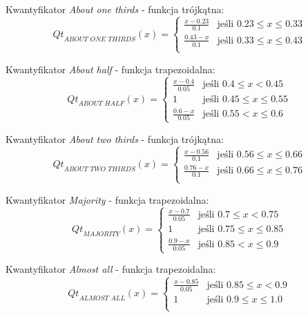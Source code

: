 \documentclass{classrep}
\begin{document}
Kwantyfikator \textit{About one thirds} - funkcja trójkątna:
\begin{equation}
{Qt}_{\textit{ABOUT ONE THIRDS}}(x)= \left\{ \begin{array}{ll}
\frac{x-0.23}{0.1} 	 & \textrm{jeśli $0.23 \leq x \leq 0.33$} \\
\frac{0.43-x}{0.1} 	 & \textrm{jeśli $0.33 \leq x \leq 0.43$} \\
\end{array} \right.
\end{equation}

Kwantyfikator \textit{About half} - funkcja trapezoidalna:
\begin{equation}
{Qt}_{\textit{ABOUT HALF}}(x)= \left\{ \begin{array}{ll}
\frac{x-0.4}{0.05} 	& \textrm{jeśli $0.4 \leq x < 0.45$} \\
1 			& \textrm{jeśli $0.45 \leq x \leq 0.55$} \\
\frac{0.6-x}{0.05} 	& \textrm{jeśli $0.55 < x \leq 0.6$}
\end{array} \right.
\end{equation}

Kwantyfikator \textit{About two thirds} - funkcja trójkątna:
\begin{equation}
{Qt}_{\textit{ABOUT TWO THIRDS}}(x)= \left\{ \begin{array}{ll}
\frac{x-0.56}{0.1} 	 & \textrm{jeśli $0.56 \leq x \leq 0.66$} \\
\frac{0.76-x}{0.1} 	 & \textrm{jeśli $0.66 \leq x \leq 0.76$} \\
\end{array} \right.
\end{equation}

Kwantyfikator \textit{Majority} - funkcja trapezoidalna:
\begin{equation}
{Qt}_{\textit{MAJORITY}}(x)= \left\{ \begin{array}{ll}
\frac{x-0.7}{0.05} 	& \textrm{jeśli $0.7 \leq x < 0.75$} \\
1 			& \textrm{jeśli $0.75 \leq x \leq 0.85$} \\
\frac{0.9-x}{0.05} 	& \textrm{jeśli $0.85 < x \leq 0.9$}
\end{array} \right.
\end{equation}

Kwantyfikator \textit{Almost all} - funkcja trapezoidalna:
\begin{equation}
{Qt}_{\textit{ALMOST ALL}}(x)= \left\{ \begin{array}{ll}
\frac{x-0.85}{0.05} 	& \textrm{jeśli $0.85 \leq x < 0.9$} \\
1 			& \textrm{jeśli $0.9 \leq x \leq 1.0$} \\
\end{array} \right.
\end{equation}
\end{document}
